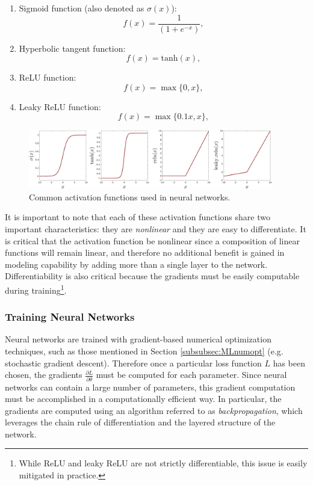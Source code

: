 \begin{enumerate}
\item Sigmoid function (also denoted as $\sigma(x)$):
\begin{equation*}
f(x) = \frac{1}{(1 + e^{-x})},
\end{equation*}
\item Hyperbolic tangent function:
\begin{equation*}
f(x) = \text{tanh}(x),
\end{equation*}
\item ReLU function:
\begin{equation*}
f(x) = \max\{0, x\},
\end{equation*}
\item Leaky ReLU function:
\begin{equation*}
f(x) = \max\{0.1x, x\},
\end{equation*}
\end{enumerate}

\begin{figure}[ht] 
\begin{center}
\includegraphics[width=0.95\textwidth]{tex/figs/app01_figs/activations.png}
\caption{Common activation functions used in neural networks.}
\label{fig:activations}
\end{center}
\end{figure}

It is important to note that each of these activation functions share two important characteristics: they are \textit{nonlinear} and they are easy to differentiate. It is critical that the activation function be nonlinear since a composition of linear functions will remain linear, and therefore no additional benefit is gained in modeling capability by adding more than a single layer to the network. Differentiability is also critical because the gradients must be easily computable during training\footnote{While ReLU and leaky ReLU are not strictly differentiable, this issue is easily mitigated in practice.}.

\subsubsection{Training Neural Networks}
Neural networks are trained with gradient-based numerical optimization techniques, such as those mentioned in Section \ref{subsubsec:MLnumopt} (e.g. stochastic gradient descent). Therefore once a particular loss function $L$ has been chosen, the gradients $\frac{\partial L}{\partial \theta}$ must be computed for each parameter. Since neural networks can contain a large number of parameters, this gradient computation must be accomplished in a computationally efficient way. In particular, the gradients are computed using an algorithm referred to as \textit{backpropagation}, which leverages the chain rule of differentiation and the layered structure of the network.

